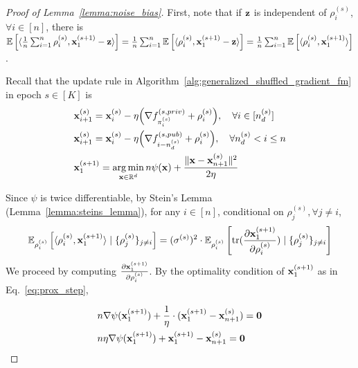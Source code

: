 \begin{proof}[Proof of Lemma~\ref{lemma:noise_bias}]
    First, note that if ${\mathbf{z}}$ is independent of $\rho_i^{(s)}$, $\forall i\in [n]$, 
    there is $\mathbb{E}\left[\langle \frac{1}{n}\sum_{i=1}^{n} \rho_i^{(s)}, {\mathbf{x}}_1^{(s+1)} - {\mathbf{z}} \rangle \right] 
    = \frac{1}{n}\sum_{i=1}^{n}\mathbb{E}\left[ \langle \rho_i^{(s)}, {\mathbf{x}}_1^{(s+1)} - {\mathbf{z}} \rangle \right] = \frac{1}{n}\sum_{i=1}^{n}\mathbb{E}\left[ \langle \rho_i^{(s)}, {\mathbf{x}}_1^{(s+1)}  \rangle \right]$.

    Recall that the update rule in Algorithm~\ref{alg:generalized_shuffled_gradient_fm} in epoch $s\in [K]$ is
    \begin{align}
        &{\mathbf{x}}_{i+1}^{(s)} = {\mathbf{x}}_{i}^{(s)} - \eta \Big(\nabla f_{\pi_i^{(s)}}^{(s, priv)} + \rho_i^{(s)}\Big),\quad \forall i \in[n_d^{(s)}]\\
        &{\mathbf{x}}_{i+1}^{(s)} = {\mathbf{x}}_i^{(s)} - \eta \Big(\nabla f_{i-n_d^{(s)}}^{(s, pub)} + \rho_i^{(s)}\Big), \quad \forall n_d^{(s)} < i \leq n\\
    \label{eq:prox_step}
        &{\mathbf{x}}_{1}^{(s+1)} = \operatorname*{arg\,min}_{{\mathbf{x}}\in\mathbb{R}^d} n \psi({\mathbf{x}}) + \frac{\| {\mathbf{x}} - {\mathbf{x}}_{n+1}^{(s)}\|^2}{2\eta}
    \end{align}

    Since $\psi$ is twice differentiable, by Stein's Lemma (Lemma~\ref{lemma:steins_lemma}), for any $i\in [n]$, conditional on $\rho_j^{(s)}, \forall j\neq i$,
    \begin{align}
    \label{eq:application_steins_lemma}
        \mathbb{E}_{\rho_i^{(s)}}\left[ \langle \rho_i^{(s)}, {\mathbf{x}}_{1}^{(s+1)} \rangle \mid \{\rho_j^{(s)}\}_{j\neq i}\right]
        = (\sigma^{(s)})^2\cdot \mathbb{E}_{\rho_i^{(s)}}\left[\text{tr}(\frac{\partial {\mathbf{x}}_1^{(s+1)}}{\partial \rho_i^{(s)}}) \mid \{\rho_j^{(s)}\}_{j\neq i} \right]
    \end{align}
    We proceed by computing $\frac{\partial {\mathbf{x}}_1^{(s+1)}}{\partial \rho_i^{(s)}}$.
    By the optimality condition of ${\mathbf{x}}_1^{(s+1)}$ as in Eq.~\ref{eq:prox_step},

    \begin{align}
        &n \nabla \psi({\mathbf{x}}_1^{(s+1)}) + \frac{1}{\eta}\cdot ({\mathbf{x}}_{1}^{(s+1)} - {\mathbf{x}}_{n+1}^{(s)})  = \mathbf{0}\\
        &n\eta \nabla \psi({\mathbf{x}}_1^{(s+1)}) + {\mathbf{x}}_1^{(s+1)} - {\mathbf{x}}_{n+1}^{(s)} = \mathbf{0}
    \end{align}


\end{proof}
